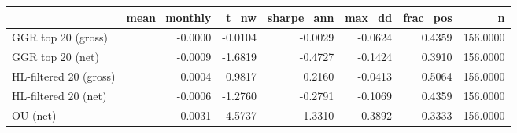 \begin{tabular}{lrrrrrr}
\toprule
 & mean_monthly & t_nw & sharpe_ann & max_dd & frac_pos & n \\
\midrule
GGR top 20 (gross) & -0.0000 & -0.0104 & -0.0029 & -0.0624 & 0.4359 & 156.0000 \\
GGR top 20 (net) & -0.0009 & -1.6819 & -0.4727 & -0.1424 & 0.3910 & 156.0000 \\
HL-filtered 20 (gross) & 0.0004 & 0.9817 & 0.2160 & -0.0413 & 0.5064 & 156.0000 \\
HL-filtered 20 (net) & -0.0006 & -1.2760 & -0.2791 & -0.1069 & 0.4359 & 156.0000 \\
OU (net) & -0.0031 & -4.5737 & -1.3310 & -0.3892 & 0.3333 & 156.0000 \\
\bottomrule
\end{tabular}
